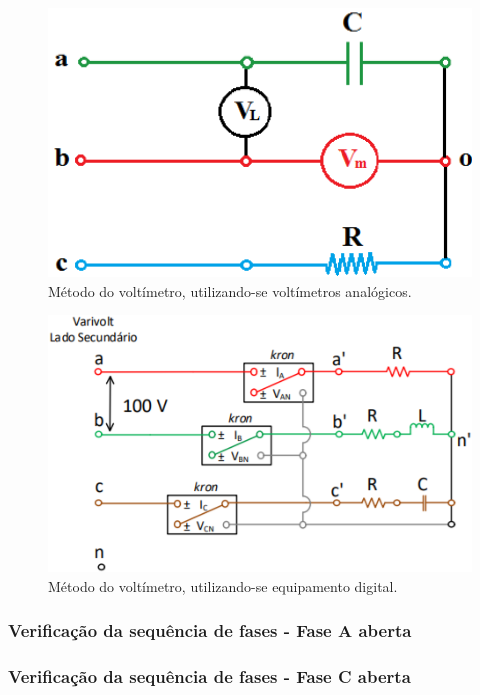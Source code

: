 \documentclass[a4paper,12pt,oneside,openany,table,xcdraw]{article}
\begin{document}
\vspace{0.2cm}
\begin{figure}[H]
\centering
\includegraphics[width=11.5cm]{m-analog}
\caption{Método do voltímetro, utilizando-se voltímetros analógicos.}
\label{m1:analogico}
\end{figure}

\vspace{0.3cm}
\begin{figure}[H]
\centering
\includegraphics[width=13cm]{m1-circuito}
\caption{Método do voltímetro, utilizando-se equipamento digital.}
\label{m1:esquema}
\end{figure}
\vspace{0.1cm}

\subsubsection{Verificação da sequência de fases - Fase A aberta}

\subsubsection{Verificação da sequência de fases - Fase C aberta}
\end{document}
